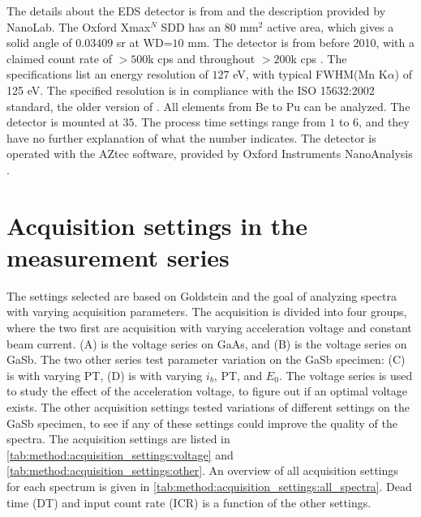 The details about the EDS detector is from \cite{oxford_xmax_80} and the description provided by NanoLab.
The Oxford Xmax$^N$ SDD has an $80$ mm$^2$ active area, which gives a solid angle of $0.03409$ sr at WD=$10$ mm.
The detector is from before 2010, with a claimed count rate of $> 500$k cps and throughout $> 200$k cps \cite{oxford_xmax_80}.
The specifications list an energy resolution of $127$ eV, with typical FWHM(Mn K$\alpha$) of 125 eV.
The specified resolution is in compliance with the ISO 15632:2002 standard, the older version of \cite{iso_qc_15632}.
All elements from Be to Pu can be analyzed.
The detector is mounted at $35$\textdegree.
The process time settings range from $1$ to $6$, and they have no further explanation of what the number indicates.
The detector is operated with the AZtec software, provided by Oxford Instruments NanoAnalysis \cite{aztec_manual}.



\section{Acquisition settings in the measurement series}
\label{method:acquisition_settings}

The settings selected are based on Goldstein \cite{goldstein_scanning_2018} and the goal of analyzing spectra with varying acquisition parameters.
The acquisition is divided into four groups, where the two first are acquisition with varying acceleration voltage and constant beam current.
(A) is the voltage series on GaAs, and (B) is the voltage series on GaSb.
The two other series test parameter variation on the GaSb specimen: (C) is with varying PT, (D) is with varying $i_b$, PT, and $E_0$.
The voltage series is used to study the effect of the acceleration voltage, to figure out if an optimal voltage exists.
The other acquisition settings tested variations of different settings on the GaSb specimen, to see if any of these settings could improve the quality of the spectra.
The acquisition settings are listed in \cref{tab:method:acquisition_settings:voltage} and \cref{tab:method:acquisition_settings:other}.
An overview of all acquisition settings for each spectrum is given in \cref{tab:method:acquisition_settings:all_spectra}.
Dead time (DT) and input count rate (ICR) is a function of the other settings.


